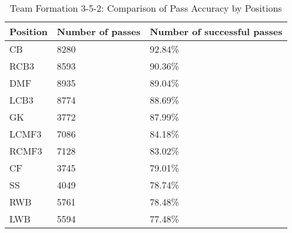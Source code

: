 \begin{table}[!htbp]
\centering
\begin{tabular}{@{}lll@{}}
\toprule
Position & Number of passes & Number of successful passes \\ \midrule
CB              & 8280             & 92.84\%         \\
RCB3            & 8593             & 90.36\%         \\
DMF             & 8935             & 89.04\%         \\
LCB3            & 8774             & 88.69\%         \\
GK              & 3772             & 87.99\%         \\
LCMF3           & 7086             & 84.18\%         \\
RCMF3           & 7128             & 83.02\%         \\
CF              & 3745             & 79.01\%         \\
SS              & 4049             & 78.74\%         \\
RWB             & 5761             & 78.48\%         \\
LWB             & 5594             & 77.48\%         \\ \bottomrule
\end{tabular}
\caption{
Team Formation 3-5-2: Comparison of Pass Accuracy by Positions}
\label{tab:352_accuracy_positions}
\end{table}